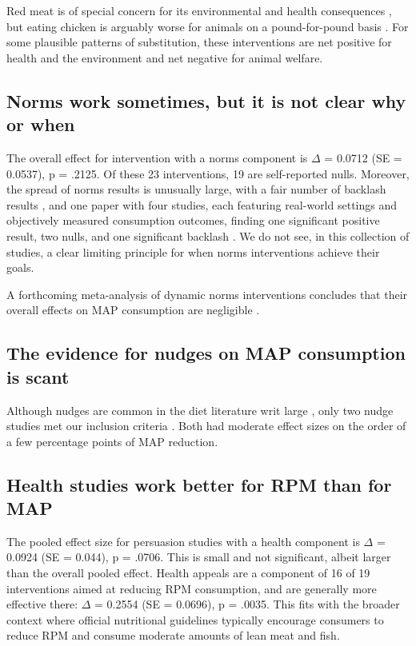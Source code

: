 \documentclass[sn-nature,pdflatex]{sn-jnl}
\begin{document}
Red meat is of special concern for its environmental and health
consequences \citep{grummon2023}, but eating chicken is arguably worse
for animals on a pound-for-pound basis \citep{mathur2022ethical}. For
some plausible patterns of substitution, these interventions are net
positive for health and the environment and net negative for animal
welfare.

\subsection{Norms work sometimes, but it is not clear why or
when}\label{sec2.5}

The overall effect for intervention with a norms component is \(\Delta\)
= 0.0712 (SE = 0.0537), p = .2125. Of these 23 interventions, 19 are
self-reported nulls. Moreover, the spread of norms results is unusually
large, with a fair number of backlash results
\citep{mattson2020, griesoph2021}, and one paper with four studies, each
featuring real-world settings and objectively measured consumption
outcomes, finding one significant positive result, two nulls, and one
significant backlash \citep{sparkman2020}. We do not see, in this
collection of studies, a clear limiting principle for when norms
interventions achieve their goals.

A forthcoming meta-analysis of dynamic norms interventions concludes
that their overall effects on MAP consumption are negligible
\citep{Weikertova2024}.

\subsection{The evidence for nudges on MAP consumption is
scant}\label{sec2.6}

Although nudges are common in the diet literature writ large
\citep{olafsson2024, cadario2020, szaszi2018}, only two nudge studies
met our inclusion criteria \citep{andersson2021}. Both had moderate
effect sizes on the order of a few percentage points of MAP reduction.

\subsection{Health studies work better for RPM than for
MAP}\label{sec2.7}

The pooled effect size for persuasion studies with a health component is
\(\Delta\) = 0.0924 (SE = 0.044), p = .0706. This is small and not
significant, albeit larger than the overall pooled effect. Health
appeals are a component of 16 of 19 interventions aimed at reducing RPM
consumption, and are generally more effective there: \(\Delta\) = 0.2554
(SE = 0.0696), p = .0035. This fits with the broader context where
official nutritional guidelines typically encourage consumers to reduce
RPM and consume moderate amounts of lean meat and fish.
\end{document}
